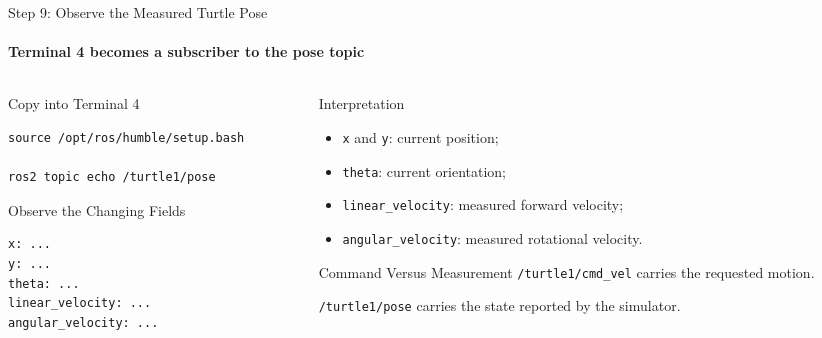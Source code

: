 \begin{frame}[fragile]{Step 9: Observe the Measured Turtle Pose}
\framesubtitle{Terminal 4 becomes a subscriber to the pose topic}

\footnotesize

\begin{columns}[T,onlytextwidth]

    \begin{column}{0.48\textwidth}
        \begin{block}{Copy into Terminal 4}
\begin{verbatim}
source /opt/ros/humble/setup.bash

ros2 topic echo /turtle1/pose
\end{verbatim}
        \end{block}

        \begin{exampleblock}{Observe the Changing Fields}
\begin{verbatim}
x: ...
y: ...
theta: ...
linear_velocity: ...
angular_velocity: ...
\end{verbatim}
        \end{exampleblock}
    \end{column}

    \begin{column}{0.48\textwidth}
        \begin{block}{Interpretation}
            \begin{itemize}
                \setlength{\itemsep}{0.16em}
                \item \texttt{x} and \texttt{y}: current position;
                \item \texttt{theta}: current orientation;
                \item \texttt{linear\_velocity}: measured forward velocity;
                \item \texttt{angular\_velocity}: measured rotational velocity.
            \end{itemize}
        \end{block}

        \vspace{0.15cm}

        \begin{alertblock}{Command Versus Measurement}
            \texttt{/turtle1/cmd\_vel} carries the requested motion.
            
            \vspace{0.15cm}
            \texttt{/turtle1/pose} carries the state reported by the simulator.
        \end{alertblock}
    \end{column}

\end{columns}

\end{frame}

